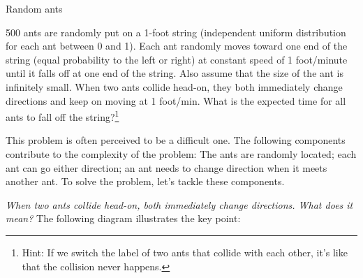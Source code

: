 \begin{problem}{Random ants}

500 ants are randomly put on a 1-foot string (independent uniform distribution for each
ant between 0 and 1). Each ant randomly moves toward one end of the string (equal
probability to the left or right) at constant speed of 1 foot/minute until it falls off at
one end of the string. Also assume that the size of the ant is infinitely small. When two
ants collide head-on, they both immediately change directions and keep on moving at 1
foot/min. What is the expected time for all ants to fall off the string?\footnote[34]{Hint: If we
switch the label of two ants that collide with each other, it's like that the collision never
happens.}

\end{problem}
\begin{solution}
This problem is often perceived to be a difficult one. The following components
contribute to the complexity of the problem: The ants are randomly located; each ant can
go either direction; an ant needs to change direction when it meets another ant. To solve
the problem, let's tackle these components.

\emph{When two ants collide head-on, both immediately change directions. What does it
mean?} The following diagram illustrates the key point:

\begin{center}
\quad
{}
\quad
{}
\end{center}


\end{solution}

